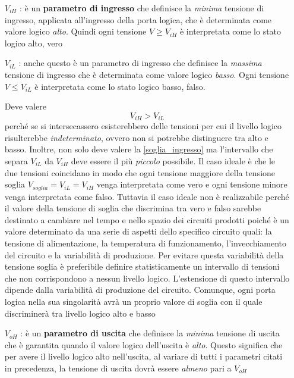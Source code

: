 \documentclass[12pt, a4paper]{report}
\begin{document}
\begin{itemize}
    \item[$V_{iH}$]: è un \textbf{parametro di ingresso} che definisce la \textit{minima} tensione di ingresso, applicata all'ingresso della porta logica, che è determinata come valore logico \textit{alto}. Quindi ogni tensione $V \geq V_{iH}$ è interpretata come lo stato logico alto, vero
    \item[$V_{iL}$]: anche questo è un parametro di ingresso che definisce la \textit{massima} tensione di ingresso che è determinata come valore logico \textit{basso}. Ogni tensione $V \leq V_{iL}$ è interpretata come lo stato logico basso, falso.
    
    Deve valere
    \begin{equation}
        V_{iH} > V_{iL}
    \label{soglia_ingresso}
    \end{equation}
    perché se si intersecassero esisterebbero delle tensioni per cui il livello logico risulterebbe \textit{indeterminato}, ovvero non si potrebbe distinguere tra alto e basso. Inoltre, non solo deve valere la \eqref{soglia_ingresso} ma l'intervallo che separa $V_{iL}$ da $V_{iH}$ deve essere il più \textit{piccolo} possibile. Il caso ideale è che le due tensioni coincidano in modo che ogni tensione maggiore della tensione soglia $V_{soglia} = V_{iL} = V_{iH}$ venga interpretata come vero e ogni tensione minore venga interpretata come falso. Tuttavia il caso ideale non è realizzabile perché il valore della tensione di soglia che discrimina tra vero e falso sarebbe destinato a cambiare nel tempo e nello spazio dei circuiti prodotti poiché è un valore determinato da una serie di aspetti dello specifico circuito quali: la tensione di alimentazione, la temperatura di funzionamento, l'invecchiamento del circuito e la variabilità di produzione. Per evitare questa variabilità della tensione soglia è preferibile definire statisticamente un intervallo di tensioni che non corrispondono a nessun livello logico. L'estensione di questo intervallo dipende dalla variabilità di produzione del circuito. Comunque, ogni porta logica nella sua singolarità avrà un proprio valore di soglia con il quale discriminerà tra livello logico alto e basso
    \item[$V_{oH}$]: è un \textbf{parametro di uscita} che definisce la \textit{minima} tensione di uscita che è garantita quando il valore logico dell'uscita è \textit{alto}. Questo significa che per avere il livello logico alto nell'uscita, al variare di tutti i parametri citati in precedenza, la tensione di uscita dovrà essere \textit{almeno} pari a $V_{oH}$

\end{itemize}
\end{document}
